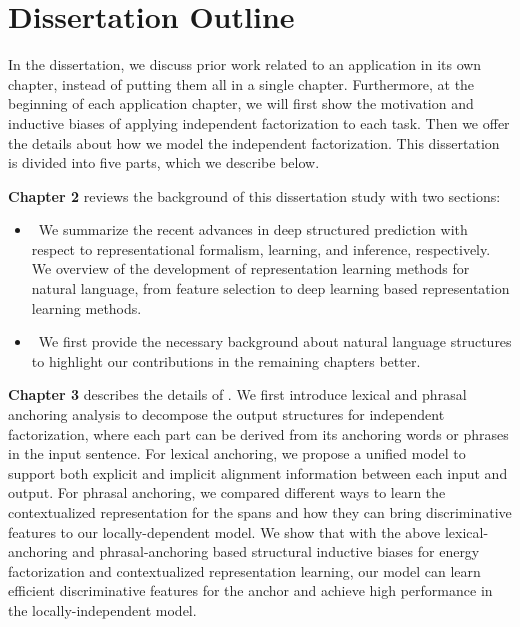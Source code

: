 
\section{Dissertation Outline}
\label{sec:intro:roadmap}

In the dissertation, we discuss prior work related to an application in its
own chapter, instead of putting them all in a single
chapter. Furthermore, at the beginning of each application chapter, we
will first show the motivation and inductive biases of applying
independent factorization to each task. Then we offer the details about
how we model the independent factorization. This dissertation is divided
into five parts, which we describe below.

\textbf{Chapter 2} reviews the background of this dissertation study
with two sections:
\begin{itemize}
\item {}~We summarize
  the recent advances in deep structured prediction with respect to
  representational formalism, learning, and inference, respectively. We
  overview of the development of representation learning methods for
  natural language, from feature selection to deep learning based
  representation learning methods.

\item {}~We first provide the necessary
  background about natural language structures to highlight our contributions in the remaining chapters better.
\end{itemize}

\textbf{Chapter 3} describes the details of . We first introduce
lexical and phrasal anchoring analysis to decompose the output
structures for independent factorization, where each part can be
derived from its anchoring words or phrases in the input sentence. For
lexical anchoring, we propose a unified model to support both explicit
and implicit alignment information between each input and output. For
phrasal anchoring, we compared different ways to learn the
contextualized representation for the spans and how they can bring
discriminative features to our locally-dependent model. We show that
with the above lexical-anchoring and phrasal-anchoring based structural
inductive biases for energy factorization and contextualized
representation learning, our model can learn efficient discriminative
features for the anchor and achieve high performance in the
locally-independent model.

